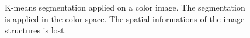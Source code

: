 \begin{figure}[htbp]
\centering
{}\hspace{1cm}
\caption{K-means segmentation applied on a color image. The segmentation is applied in the color space. The spatial informations of the image structures is lost.}
\label{fig:tutorial:kmeans:matlab:color}
\end{figure}
